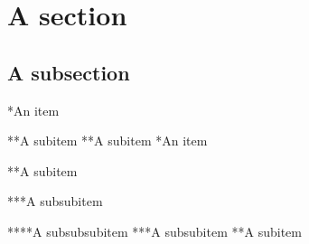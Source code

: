 \documentclass[a4paper]{article}
\begin{document}
    \tableofcontents
    \clearpage
    
    \section{A section}

    \subsection{A subsection}

    *An item

    **A subitem
    **A subitem
    *An item

    **A subitem

    ***A subsubitem

    ****A subsubsubitem
    ***A subsubitem
    **A subitem

    \clearpage
    
    
    \clearpage
    \printglossaries
\end{document}
